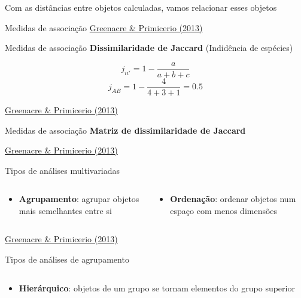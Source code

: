 \documentclass[
  ignorenonframetext,
]{beamer}
\providecommand{\tightlist}{%
  \setlength{\itemsep}{0pt}\setlength{\parskip}{0pt}}\usepackage{longtable,booktabs,array}
\begin{document}
\begin{frame}{Com as distâncias entre objetos calculadas, vamos
relacionar esses objetos}
\begin{block}{Medidas de associação}
\href{https://www.fbbva.es/microsite/multivariate-statistics/}{Greenacre
\& Primicerio (2013)}
\end{block}

\begin{block}{Medidas de associação}
\protect\hypertarget{medidas-de-associauxe7uxe3o-4}{}
\textbf{Dissimilaridade de Jaccard} (Indidência de espécies)

\[j_{ii'} = 1 - \frac{a}{a + b + c}\]
\[j_{AB} = 1 - \frac{4}{4 + 3 + 1} = 0.5\]

\href{https://www.fbbva.es/microsite/multivariate-statistics/}{Greenacre
\& Primicerio (2013)}
\end{block}

\begin{block}{Medidas de associação}
\protect\hypertarget{medidas-de-associauxe7uxe3o-5}{}
\textbf{Matriz de dissimilaridade de Jaccard}

\href{https://www.fbbva.es/microsite/multivariate-statistics/}{Greenacre
\& Primicerio (2013)}
\end{block}

\begin{block}{Tipos de análises multivariadas}
\protect\hypertarget{tipos-de-anuxe1lises-multivariadas-1}{}
\begin{columns}[T]
\begin{column}{0.5\textwidth}
\begin{itemize}
\tightlist
\item
  \textbf{Agrupamento}: agrupar objetos mais semelhantes entre si
\end{itemize}
\end{column}

\begin{column}{0.5\textwidth}
\begin{itemize}
\item
  \textbf{Ordenação}: ordenar objetos num espaço com menos dimensões
\end{itemize}
\end{column}
\end{columns}

\href{https://www.fbbva.es/microsite/multivariate-statistics/}{Greenacre
\& Primicerio (2013)}
\end{block}

\begin{block}{Tipos de análises de agrupamento}
\protect\hypertarget{tipos-de-anuxe1lises-de-agrupamento}{}
\begin{columns}[T]
\begin{column}{0.5\textwidth}
\begin{itemize}
\tightlist
\item
  \textbf{Hierárquico}: objetos de um grupo se tornam elementos do grupo
  superior
\end{itemize}
\end{column}


\end{columns}
\end{block}
\end{frame}
\end{document}
